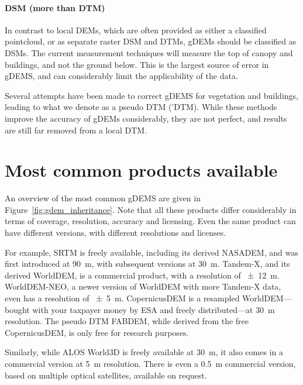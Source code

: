 

\paragraph{DSM (more than DTM)}
In contrast to local DEMs, which are often provided as either a classified pointcloud, or as separate raster DSM and DTMs, gDEMs should be classified as DSMs.
The current measurement techniques will measure the top of canopy and buildings, and not the ground below.
This is the largest source of error in gDEMS, and can considerably limit the applicability of the data.

Several attempts have been made to correct gDEMS for vegetation and buildings, leading to what we denote as a pseudo DTM ('DTM).
While these methods improve the accuracy of gDEMs considerably, they are not perfect, and results are still far removed from a local DTM.

%
\section[Most common products]{Most common products available}

An overview of the most common gDEMS are given in Figure~\ref{fig:gdem_inheritance}.
Note that all these products differ considerably in terms of coverage, resolution, accuracy and licensing.
Even the same product can have different versions, with different resolutions and licenses.

For example, SRTM is freely available, including its derived NASADEM, and was first introduced at \qty{90}{m}, with subsequent versions at \qty{30}{m}.
Tandem-X, and its derived WorldDEM, is a commercial product, with a resolution of \qty{\pm12}{m}.
WorldDEM-NEO, a newer version of WorldDEM with more Tandem-X data, even has a resolution of \qty{\pm5}{m}.
CopernicusDEM is a resampled WorldDEM---bought with your taxpayer money by ESA and freely distributed---at \qty{30}{m} resolution.
The pseudo DTM FABDEM, while derived from the free CopernicusDEM, is only free for research purposes.

Similarly, while ALOS World3D is freely available at \qty{30}{m}, it also comes in a commercial version at \qty{5}{m} resolution.
There is even a \qty{0.5}{m} commercial version, based on multiple optical satellites, available on request.

